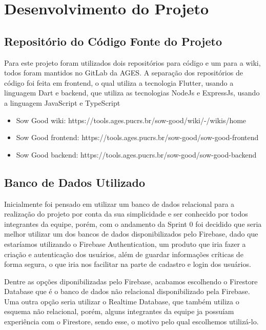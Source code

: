 \section[Desenvolvimento do Projeto]{Desenvolvimento do Projeto}

\subsection{Repositório do Código Fonte do Projeto}
Para este projeto foram utilizados dois repositórios para código e um para a wiki, todos foram mantidos no GitLab da AGES. A separação dos repositórios de código foi feita em frontend, o qual utiliza a tecnologia Flutter\cite{flutter}, usando a linguagem Dart\cite{dart} e backend, que utiliza as tecnologias NodeJs\cite{nodejs} e ExpressJs\cite{expressjs}, usando a linguagem JavaScript\cite{javascript} e TypeScript\cite{typescript}

\begin{itemize}
  \item Sow Good wiki: https://tools.ages.pucrs.br/sow-good/wiki/-/wikis/home
  \item Sow Good frontend: https://tools.ages.pucrs.br/sow-good/sow-good-frontend
  \item Sow Good backend: https://tools.ages.pucrs.br/sow-good/sow-good-backend
\end{itemize}

\subsection{Banco de Dados Utilizado}
Inicialmente foi pensado em utilizar um banco de dados relacional para a realização do projeto por conta da sua simplicidade e ser conhecido por todos integrantes da equipe, porém, com o andamento da Sprint 0 foi decidido que seria melhor utilizar um dos bancos de dados disponibilizados pelo Firebase, dado que estaríamos utilizando o Firebase Authentication, um produto que iria fazer a criação e autenticação dos usuários, além de guardar informações críticas de forma segura, o que iria nos facilitar na parte de cadastro e login dos usuários.

Dentre as opções diponibilizadas pelo Firebase, acabamos escolhendo o Firestore\cite{firestore} Database que é o banco de dados não relacional disponibilizado pela Firebase\cite{firebase}. Uma outra opção seria utilizar o Realtime Database\cite{realtimedb}, que também utiliza o esquema não relacional, porém, alguns integrantes da equipe ja possuíam experiência com o Firestore\cite{firestore}, sendo esse, o motivo pelo qual escolhemos utilizá-lo.

